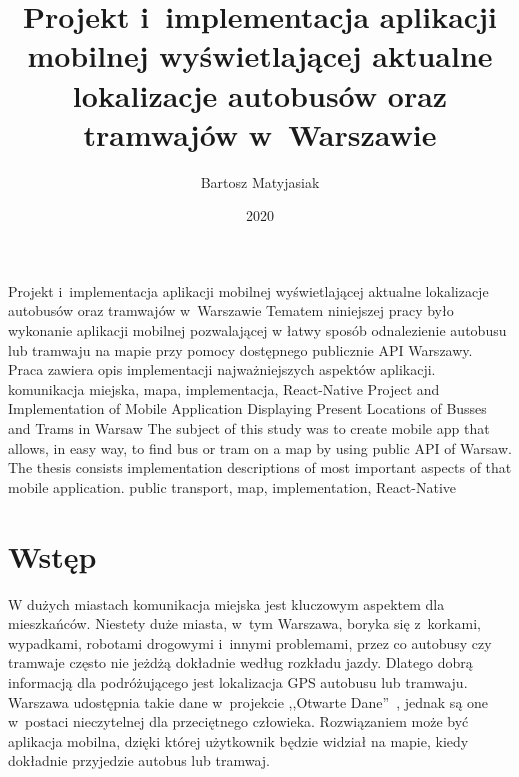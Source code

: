 \documentclass{SGGW-thesis}
\title{Projekt i~implementacja aplikacji mobilnej wyświetlającej aktualne lokalizacje autobusów oraz tramwajów w~Warszawie}
\author{Bartosz Matyjasiak}
\date{2020}
\begin{document}
\maketitle
\statementpage
\abstractpage
{Projekt i~implementacja aplikacji mobilnej wyświetlającej aktualne lokalizacje autobusów oraz tramwajów w~Warszawie}
{
Tematem niniejszej pracy było wykonanie aplikacji mobilnej pozwalającej w łatwy sposób odnalezienie autobusu lub tramwaju na mapie przy pomocy dostępnego publicznie API Warszawy.
Praca zawiera opis implementacji najważniejszych aspektów aplikacji.
}
{komunikacja miejska, mapa, implementacja, React-Native}
{Project and Implementation of Mobile Application Displaying Present Locations of Busses and Trams in Warsaw}
{
The subject of this study was to create mobile app that allows, in easy way, to find bus or tram on a map by using public API of Warsaw.
The thesis consists implementation descriptions of most important aspects of that mobile application.
}
{public transport, map, implementation, React-Native}


{
  \doublespacing
  \tableofcontents
}

\startchapterfromoddpage %


\chapter{Wstęp}
W dużych miastach komunikacja miejska jest kluczowym aspektem dla mieszkańców.
Niestety duże miasta, w~tym Warszawa, boryka się z~korkami, wypadkami, robotami drogowymi i~innymi problemami, przez
co autobusy czy tramwaje często nie jeżdżą dokładnie według rozkładu jazdy.
Dlatego dobrą informacją dla podróżującego jest lokalizacja GPS autobusu lub tramwaju.
Warszawa udostępnia takie dane w~projekcie ,,Otwarte Dane''~\cite{APIWARSZAWA}, jednak są one w~postaci nieczytelnej dla przeciętnego człowieka.
Rozwiązaniem może być aplikacja mobilna, dzięki której użytkownik będzie widział na mapie, kiedy dokładnie przyjedzie autobus lub tramwaj.
\end{document}
